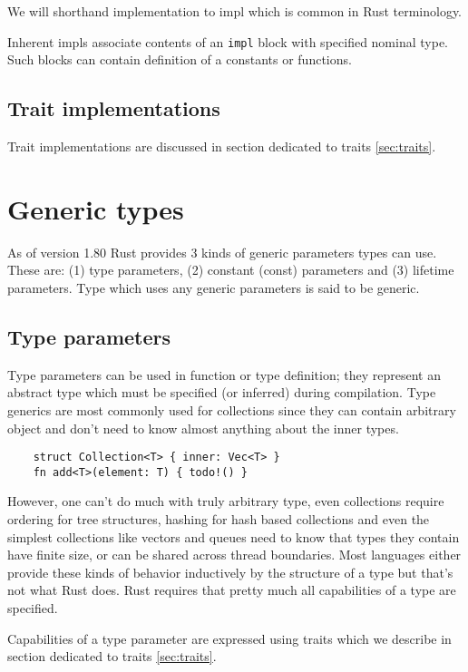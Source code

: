 We will shorthand implementation to impl which is common in Rust terminology.

Inherent impls associate contents of an \texttt{impl} block with specified nominal type.
Such blocks can contain definition of a constants or functions. 

\subsection{Trait implementations}

Trait implementations are discussed in section dedicated to traits \ref{sec:traits}.

\section{Generic types}

As of version 1.80 Rust provides 3 kinds of generic parameters types can use. 
These are: (1) type parameters, (2) constant (const) parameters and (3) lifetime parameters. 
Type which uses any generic parameters is said to be generic.

\subsection{Type parameters}

Type parameters can be used in function or type definition; they represent an abstract type which must be specified (or inferred) during compilation.
Type generics are most commonly used for collections since they can contain arbitrary object and don't need to know almost anything about the inner types.

\begin{lstlisting}
    struct Collection<T> { inner: Vec<T> }
    fn add<T>(element: T) { todo!() }
\end{lstlisting}

However, one can't do much with truly arbitrary type, even collections require ordering for tree structures, hashing for hash based collections and even the simplest collections
like vectors and queues need to know that types they contain have finite size, or can be shared across thread boundaries. Most languages either provide these kinds of behavior
inductively by the structure of a type but that's not what Rust does. Rust requires that pretty much all capabilities of a type are specified.

Capabilities of a type parameter are expressed using traits which we describe in section dedicated to traits \ref{sec:traits}.

